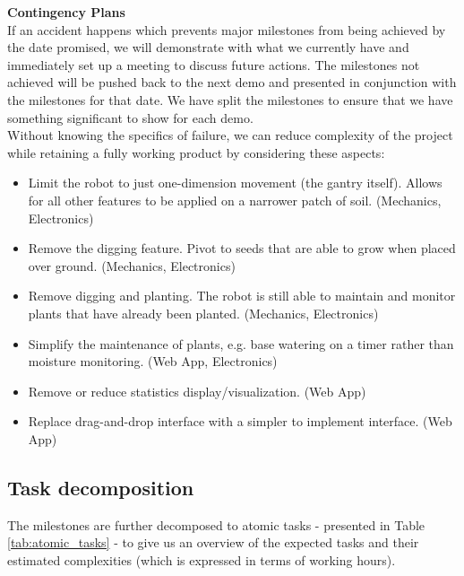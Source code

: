 \documentclass{article}
\begin{document}
\textbf{Contingency Plans} \\
If an accident happens which prevents major milestones from being achieved by the date promised, we will demonstrate with what we currently have and immediately set up a meeting to discuss future actions. The milestones not achieved will be pushed back to the next demo and presented in conjunction with the milestones for that date. We have split the milestones to ensure that we have something significant to show for each demo.  \\
Without knowing the specifics of failure, we can reduce complexity of the project while retaining a fully working product by considering these aspects:
\begin{itemize}
    \vspace{-3mm}
    \setlength\itemsep{-0.6em}
    \item Limit the robot to just one-dimension movement (the gantry itself). Allows for all other features to be applied on a narrower patch of soil. (Mechanics, Electronics) 
    \item Remove the digging feature. Pivot to seeds that are able to grow when placed over ground. (Mechanics, Electronics)
    \item Remove digging and planting. The robot is still able to maintain and monitor plants that have already been planted. (Mechanics, Electronics)
    \item Simplify the maintenance of plants, e.g. base watering on a timer rather than moisture monitoring. (Web App, Electronics)
    \item Remove or reduce statistics display/visualization. (Web App)
    \item Replace drag-and-drop interface with a simpler to implement interface. (Web App)
    \vspace{-3mm}
\end{itemize}

\subsection{Task decomposition} 

The milestones are further decomposed to atomic tasks - presented in Table \ref{tab:atomic_tasks} - to give us an overview of the expected tasks and their estimated complexities (which is expressed in terms of working hours).
\end{document}
